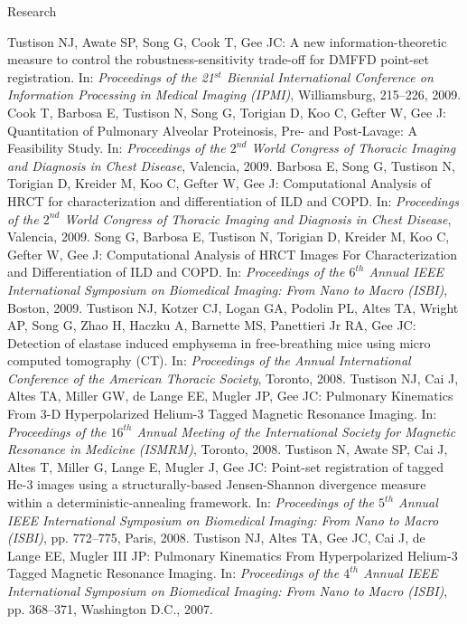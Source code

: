 \documentclass{resume}
\begin{document}
\begin{category}{Research}
\begin{itemize}
    \citemnobullet Tustison NJ, Awate SP, Song G, Cook T, Gee JC: A new information-theoretic measure to control the robustness-sensitivity trade-off for DMFFD point-set registration. In: {\em Proceedings of the 21$^{st}$ Biennial International Conference on Information Processing in Medical Imaging (IPMI)}, Williamsburg, 215--226, 2009.   
     \citemnobullet Cook T, Barbosa E, Tustison N, Song G, Torigian D, Koo C, Gefter W, Gee J: Quantitation of Pulmonary Alveolar Proteinosis, Pre- and Post-Lavage: A Feasibility Study. In: {\em Proceedings of the $2^{nd}$ World Congress of Thoracic Imaging and Diagnosis in Chest Disease}, Valencia, 2009.
     \citemnobullet Barbosa E, Song G, Tustison N, Torigian D, Kreider M, Koo C, Gefter W, Gee J: Computational Analysis of HRCT for characterization and differentiation of ILD and COPD. In: {\em Proceedings of the $2^{nd}$ World Congress of Thoracic Imaging and Diagnosis in Chest Disease}, Valencia, 2009.
    \citemnobullet  Song G, Barbosa E, Tustison N, Torigian D, Kreider M, Koo C, Gefter W, Gee J: Computational Analysis of HRCT Images For Characterization and Differentiation of ILD and COPD. In:  {\em Proceedings of the $6^{th}$ Annual IEEE International Symposium on Biomedical Imaging: From Nano to Macro (ISBI)}, Boston, 2009.
     \citemnobullet Tustison NJ, Kotzer CJ, Logan GA, Podolin PL, Altes TA, Wright AP, Song G, Zhao H, Haczku A,  Barnette MS, Panettieri Jr RA, Gee JC: Detection of elastase induced emphysema in free-breathing mice using micro computed tomography (CT). In:  {\em Proceedings of the Annual International Conference of the American Thoracic Society}, Toronto, 2008.
    \citemnobullet Tustison NJ, Cai J, Altes TA, Miller GW, de Lange EE, Mugler JP, Gee JC: Pulmonary Kinematics From 3-D Hyperpolarized Helium-3 Tagged Magnetic Resonance Imaging. In:  {\em Proceedings of the $16^{th}$ Annual Meeting of the International Society for Magnetic Resonance in Medicine (ISMRM)}, Toronto, 2008.   
    \citemnobullet  Tustison N, Awate SP, Cai J, Altes T, Miller G, Lange E, Mugler J, Gee JC: Point-set registration of tagged He-3 images using a structurally-based Jensen-Shannon divergence measure within a deterministic-annealing framework. In:  {\em Proceedings of the $5^{th}$ Annual IEEE International Symposium on Biomedical Imaging: From Nano to Macro (ISBI)}, pp. 772--775, Paris, 2008.
    \citemnobullet    Tustison NJ, Altes TA, Gee JC, Cai J, de Lange EE, Mugler III JP: Pulmonary Kinematics From Hyperpolarized Helium-3 Tagged Magnetic Resonance Imaging. In: {\em Proceedings of the $4^{th}$ Annual IEEE International Symposium on Biomedical Imaging: From Nano to Macro (ISBI)}, pp. 368--371, Washington D.C., 2007.

\end{itemize}
\end{category}
\end{document}
